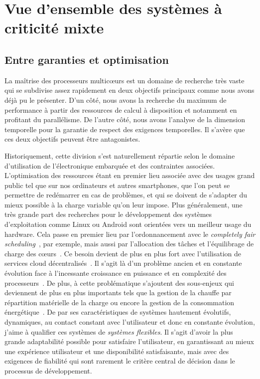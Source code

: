 \documentclass[french, a4paper, 11pt, twoside, pdftex]{StyleThese}
\begin{document}
\section{Vue d'ensemble des systèmes à criticité mixte}
    \subsection{Entre garanties et optimisation}
    La maîtrise des processeurs multicœurs est un domaine de recherche très vaste qui se subdivise assez rapidement en deux objectifs principaux comme nous avons déjà pu le présenter. D'un côté, nous avons la recherche du maximum de performance à partir des ressources de calcul à disposition et notamment en profitant du parallélisme. De l'autre côté, nous avons l'analyse de la dimension temporelle pour la garantie de respect des exigences temporelles. Il s'avère que ces deux objectifs peuvent être antagonistes.
    
    Historiquement, cette division s'est naturellement répartie selon le domaine d'utilisation de l'électronique embarquée et des contraintes associées. L'optimisation des ressources étant en premier lieu associée avec des usages grand public tel que sur nos ordinateurs et autres smartphones, que l'on peut se permettre de redémarrer en cas de problèmes, et qui se doivent de s'adapter du mieux possible à la charge variable qu'on leur impose. Plus généralement, une très grande part des recherches pour le développement des systèmes d'exploitation comme Linux ou Android sont orientées vers un meilleur usage du hardware. Cela passe en premier lieu par l'ordonnancement avec le \textit{completely fair scheduling}~\cite{pabla_completely_2009}, \cite{pricopi_task_2014} par exemple, mais aussi par l'allocation des tâches et l'équilibrage de charge des cœurs~\cite{pathania_distributed_2016}. Ce besoin devient de plus en plus fort avec l'utilisation de services cloud décentralisés~\cite{walsh_utility_2004}. Il s'agit là d'un problème ancien et en constante évolution face à l'incessante croissance en puissance et en complexité des processeurs~\cite{lozi_linux_2016}. De plus, à cette problématique s'ajoutent des sous-enjeux qui deviennent de plus en plus importants tels que la gestion de la chauffe par répartition matérielle de la charge ou encore la gestion de la consommation énergétique~\cite{li_optimizing_2016}. De par ses caractéristiques de systèmes hautement évolutifs, dynamiques, au contact constant avec l'utilisateur et donc en constante évolution, j'aime à qualifier ces systèmes de \textit{systèmes flexibles}. Il s'agit d'avoir la plus grande adaptabilité possible pour satisfaire l'utilisateur, en garantissant au mieux une expérience utilisateur et une disponibilité satisfaisante, mais avec des exigences de fiabilité qui sont rarement le critère central de décision dans le processus de développement.
        
\end{document}
